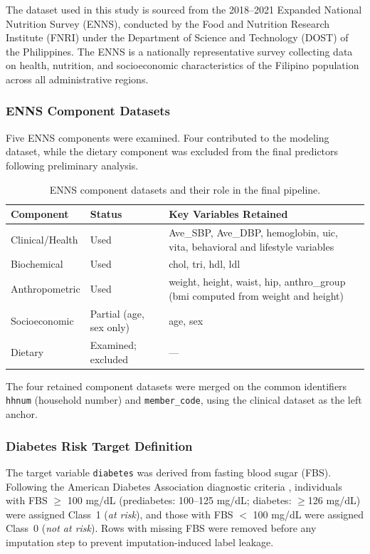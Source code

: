 The dataset used in this study is sourced from the 2018--2021 Expanded National Nutrition Survey (ENNS), conducted by the Food and Nutrition Research Institute (FNRI) under the Department of Science and Technology (DOST) of the Philippines. The ENNS is a nationally representative survey collecting data on health, nutrition, and socioeconomic characteristics of the Filipino population across all administrative regions.

\subsubsection{ENNS Component Datasets}

Five ENNS components were examined. Four contributed to the modeling dataset, while the dietary component was excluded from the final predictors following preliminary analysis.

\begin{table}[H]
\centering
\caption{ENNS component datasets and their role in the final pipeline.}
\label{tab:enns_components}
\begin{tabular}{p{2.8cm}p{2cm}p{6.5cm}}
\hline
\textbf{Component} & \textbf{Status} & \textbf{Key Variables Retained} \\
\hline
Clinical/Health & Used & Ave\_SBP, Ave\_DBP, hemoglobin, uic, vita, behavioral and lifestyle variables \\
Biochemical & Used & chol, tri, hdl, ldl \\
Anthropo\-metric & Used & weight, height, waist, hip, anthro\_group (bmi computed from weight and height) \\
Socioeconomic & Partial (age, sex only) & age, sex \\
Dietary & Examined; excluded & --- \\
\hline
\end{tabular}
\end{table}

The four retained component datasets were merged on the common identifiers \texttt{hhnum} (household number) and \texttt{member\_code}, using the clinical dataset as the left anchor.

\subsubsection{Diabetes Risk Target Definition}

The target variable \texttt{diabetes} was derived from fasting blood sugar (FBS). Following the American Diabetes Association diagnostic criteria \cite{ada_diabetes_diagnosis}, individuals with FBS $\geq$ 100 mg/dL (prediabetes: 100--125 mg/dL; diabetes: $\geq$126 mg/dL) were assigned Class~1 (\textit{at risk}), and those with FBS $<$ 100 mg/dL were assigned Class~0 (\textit{not at risk}). Rows with missing FBS were removed before any imputation step to prevent imputation-induced label leakage.

